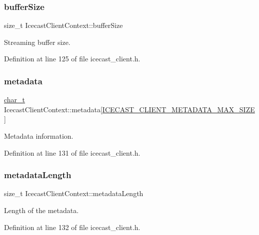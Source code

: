 \subsubsection{\texorpdfstring{buffer\+Size}{bufferSize}}
{\footnotesize\ttfamily size\+\_\+t Icecast\+Client\+Context\+::buffer\+Size}



Streaming buffer size. 



Definition at line 125 of file icecast\+\_\+client.\+h.

\mbox{\label{structIcecastClientContext_a746986eafa63d50323d7d4602b295867}} 
\subsubsection{\texorpdfstring{metadata}{metadata}}
{\footnotesize\ttfamily \hyperlink{compiler__port_8h_a40bb5262bf908c328fbcfbe5d29d0201}{char\+\_\+t} Icecast\+Client\+Context\+::metadata\mbox{[}\hyperlink{icecast__client_8h_adeb8d82a71fa7bed56f9a1a2471b2a56}{I\+C\+E\+C\+A\+S\+T\+\_\+\+C\+L\+I\+E\+N\+T\+\_\+\+M\+E\+T\+A\+D\+A\+T\+A\+\_\+\+M\+A\+X\+\_\+\+S\+I\+ZE}\mbox{]}}



Metadata information. 



Definition at line 131 of file icecast\+\_\+client.\+h.

\mbox{\label{structIcecastClientContext_a425bb275c42c40b5ea5b62831c867937}} 
\subsubsection{\texorpdfstring{metadata\+Length}{metadataLength}}
{\footnotesize\ttfamily size\+\_\+t Icecast\+Client\+Context\+::metadata\+Length}



Length of the metadata. 



Definition at line 132 of file icecast\+\_\+client.\+h.

